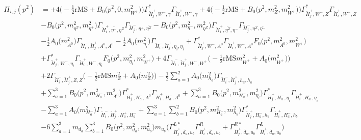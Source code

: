 \begin{itemize}
\begin{align} 
\Pi_{i,j}(p^2) &= +4 \Big(-\frac{1}{2} \text{rMS}  + {B_0\Big(p^{2},0,m^2_{W^+}\Big)}\Big){\Gamma^*_{\check{H}^+_{{j}},W^-,\gamma}} {\Gamma_{\check{H}^+_{{i}},W^-,\gamma}} +4 \Big(-\frac{1}{2} \text{rMS}  + {B_0\Big(p^{2},m^2_{Z},m^2_{W^+}\Big)}\Big){\Gamma^*_{\check{H}^+_{{j}},W^-,Z}} {\Gamma_{\check{H}^+_{{i}},W^-,Z}} \nonumber \\ 
 &- {B_0\Big(p^{2},m^2_{\eta^Z},m^2_{\eta^+}\Big)} {\Gamma_{\check{H}^+_{{i}},\bar{\eta^+},\eta^Z}} {\Gamma_{\check{H}^-_{{j}},\eta^+,\bar{\eta^Z}}} - {B_0\Big(p^{2},m^2_{\eta^-},m^2_{\eta^Z}\Big)} {\Gamma_{\check{H}^+_{{i}},\bar{\eta^Z},\eta^-}} {\Gamma_{\check{H}^-_{{j}},\eta^Z,\bar{\eta^-}}} \nonumber \\ 
 &-\frac{1}{2} {A_0\Big(m^2_{A^0}\Big)} {\Gamma_{\check{H}^-_{{i}},\check{H}^+_{{j}},A^0,A^0}} -\frac{1}{2} {A_0\Big(m^2_{\eta_i}\Big)} {\Gamma_{\check{H}^-_{{i}},\check{H}^+_{{j}},\eta_i,\eta_i}} +{\Gamma^*_{\check{H}^+_{{j}},W^-,A^0}} {\Gamma_{\check{H}^+_{{i}},W^-,A^0}} {F_0\Big(p^{2},m^2_{A^0},m^2_{W^+}\Big)} \nonumber \\ 
 &+{\Gamma^*_{\check{H}^+_{{j}},W^-,\eta_i}} {\Gamma_{\check{H}^+_{{i}},W^-,\eta_i}} {F_0\Big(p^{2},m^2_{\eta_i},m^2_{W^+}\Big)} +4 {\Gamma_{\check{H}^-_{{i}},\check{H}^+_{{j}},W^-,W^+}} \Big(-\frac{1}{2} \text{rMS} m^2_{W^+}  + {A_0\Big(m^2_{W^+}\Big)}\Big)\nonumber \\ 
 &+2 {\Gamma_{\check{H}^-_{{i}},\check{H}^+_{{j}},Z,Z}} \Big(-\frac{1}{2} \text{rMS} m^2_{Z}  + {A_0\Big(m^2_{Z}\Big)}\Big)-\frac{1}{2} \sum_{a=1}^{2}{A_0\Big(m^2_{h_{{a}}}\Big)} {\Gamma_{\check{H}^-_{{i}},\check{H}^+_{{j}},h_{{a}},h_{{a}}}}  \nonumber \\ 
 &+\sum_{a=1}^{3}{B_0\Big(p^{2},m^2_{H^-_{{a}}},m^2_{A^0}\Big)} {\Gamma^*_{\check{H}^+_{{j}},H^-_{{a}},A^0}} {\Gamma_{\check{H}^+_{{i}},H^-_{{a}},A^0}} +\sum_{a=1}^{3}{B_0\Big(p^{2},m^2_{H^-_{{a}}},m^2_{\eta_i}\Big)} {\Gamma^*_{\check{H}^+_{{j}},H^-_{{a}},\eta_i}} {\Gamma_{\check{H}^+_{{i}},H^-_{{a}},\eta_i}} \nonumber \\ 
 &- \sum_{a=1}^{3}{A_0\Big(m^2_{H^-_{{a}}}\Big)} {\Gamma_{\check{H}^-_{{i}},\check{H}^+_{{j}},H^+_{{a}},H^-_{{a}}}}  +\sum_{a=1}^{3}\sum_{b=1}^{2}{B_0\Big(p^{2},m^2_{H^-_{{a}}},m^2_{h_{{b}}}\Big)} {\Gamma^*_{\check{H}^+_{{j}},H^-_{{a}},h_{{b}}}} {\Gamma_{\check{H}^+_{{i}},H^-_{{a}},h_{{b}}}} \nonumber \\ 
 &-6 \sum_{a=1}^{3}m_{d_{{a}}} \sum_{b=1}^{3}{B_0\Big(p^{2},m^2_{d_{{a}}},m^2_{u_{{b}}}\Big)} m_{u_{{b}}} \Big({\Gamma^{L*}_{\check{H}^+_{{j}},\bar{d}_{{a}},u_{{b}}}} {\Gamma^R_{\check{H}^+_{{i}},\bar{d}_{{a}},u_{{b}}}}  + {\Gamma^{R*}_{\check{H}^+_{{j}},\bar{d}_{{a}},u_{{b}}}} {\Gamma^L_{\check{H}^+_{{i}},\bar{d}_{{a}},u_{{b}}}} \Big)  \nonumber \\ 

\end{align}
\end{itemize}
